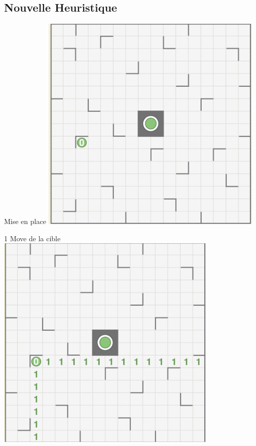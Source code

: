 \documentclass{beamer}
\begin{document}
    \subsection{Nouvelle Heuristique} 
    \begin{frame}{Mise en place}
        \centering
        \includegraphics[scale=0.45]{Images/h1.png}
    \end{frame}
    \begin{frame}{1 Move de la cible}
        \centering
        \includegraphics[scale=0.45]{Images/h11.png}
    \end{frame}
\end{document}
